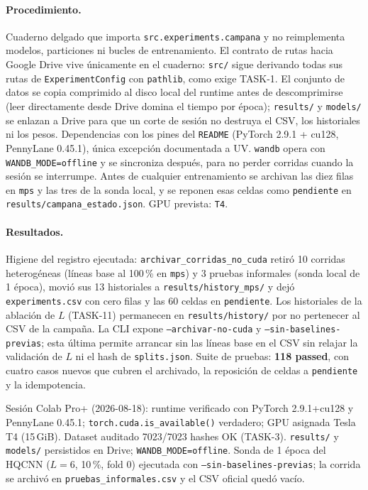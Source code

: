 \paragraph{Procedimiento.}
Cuaderno delgado que importa \texttt{src.experiments.campana} y no reimplementa modelos,
particiones ni bucles de entrenamiento. El contrato de rutas hacia Google Drive vive
únicamente en el cuaderno: \texttt{src/} sigue derivando todas sus rutas de
\texttt{ExperimentConfig} con \texttt{pathlib}, como exige TASK-1. El conjunto de datos se copia
comprimido al disco local del runtime antes de descomprimirse (leer directamente desde Drive
domina el tiempo por época); \texttt{results/} y \texttt{models/} se enlazan a Drive para que un
corte de sesión no destruya el CSV, los historiales ni los pesos. Dependencias con los pines del
\texttt{README} (PyTorch 2.9.1 + cu128, PennyLane 0.45.1), única excepción documentada a UV.
\texttt{wandb} opera con \texttt{WANDB\_MODE=offline} y se sincroniza después, para no perder
corridas cuando la sesión se interrumpe. Antes de cualquier entrenamiento se archivan las diez
filas en \texttt{mps} y las tres de la sonda local, y se reponen esas celdas como
\texttt{pendiente} en \texttt{results/campana\_estado.json}. GPU prevista: \texttt{T4}.

\paragraph{Resultados.}
Higiene del registro ejecutada: \texttt{archivar\_corridas\_no\_cuda} retiró 10 corridas
heterogéneas (líneas base al 100\,\% en \texttt{mps}) y 3 pruebas informales (sonda local de
1 época), movió sus 13 historiales a \texttt{results/history\_mps/} y dejó \texttt{experiments.csv}
con cero filas y las 60 celdas en \texttt{pendiente}. Los historiales de la ablación de $L$
(TASK-11) permanecen en \texttt{results/history/} por no pertenecer al CSV de la campaña.
La CLI expone \texttt{--archivar-no-cuda} y \texttt{--sin-baselines-previas}; esta última
permite arrancar sin las líneas base en el CSV sin relajar la validación de $L$ ni el hash de
\texttt{splits.json}. Suite de pruebas: \textbf{118 passed}, con cuatro casos nuevos que cubren
el archivado, la reposición de celdas a \texttt{pendiente} y la idempotencia.

Sesión Colab Pro+ (2026-08-18): runtime verificado con PyTorch 2.9.1+cu128 y PennyLane 0.45.1;
\texttt{torch.cuda.is\_available()} verdadero; GPU asignada Tesla T4 (15\,GiB). Dataset auditado
7023/7023 hashes OK (TASK-3). \texttt{results/} y \texttt{models/} persistidos en Drive;
\texttt{WANDB\_MODE=offline}. Sonda de 1 época del HQCNN ($L=6$, 10\,\%, fold 0) ejecutada con
\texttt{--sin-baselines-previas}; la corrida se archivó en \texttt{pruebas\_informales.csv} y el
CSV oficial quedó vacío.

